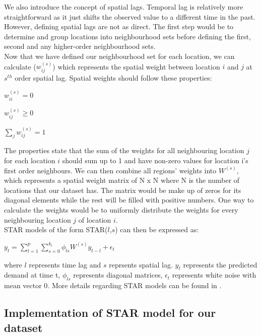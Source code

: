 \documentclass[nonblindrev,msom]{informs3} %
\begin{document}
\noindent We also introduce the concept of spatial lags. Temporal lag is relatively more straightforward as it just shifts the observed value to a different time in the past. However, defining spatial lags are not as direct. The first step would be to determine and group locations into neighbourhood sets before defining the first, second and any higher-order neighbourhood sets.  \\

\noindent Now that we have defined our neighbourhood set for each location, we can calculate ($w_{ij}^{(s)}$) which represents the spatial weight between location $i$ and $j$ at $s^{th}$ order spatial lag. Spatial weights should follow these properties: 

\begin{center}

	$\displaystyle w_{ii}^{(s)} = 0$
	
    $\displaystyle w_{ij}^{(s)} \geq 0$
    
    $\displaystyle \sum_{j} w_{ij}^{(s)} = 1$
\end{center}

\noindent The properties state that the sum of the weights for all neighbouring location $j$ for each location $i$ should sum up to 1 and have non-zero values for location i's first order neighbours. We can then combine all regions' weights into $W^{(s)}$, which represents a spatial weight matrix of N x N where N is the number of locations that our dataset has. The matrix would be make up of zeros for its diagonal elements while the rest will be filled with positive numbers. One way to calculate the weights would be to uniformly distribute the weights for every neighbouring location $j$ of location $i$. \\


\noindent STAR models of the form STAR($l$,$s$) can then be expressed as: 

\begin{center}
    $\displaystyle y_{t} = \sum_{l=1}^{p}\sum_{s=0}^{k_l}\phi_{ls} W^{(s)}y_{t-l} + \epsilon_{t}$
\end{center}

\noindent where $l$ represents time lag and $s$ reprsents spatial lag. $y_{t}$ represents the predicted demand at time t, $\phi_{ls}$ represents diagonal matrices, $\epsilon_{t}$ represents white noise with mean vector 0. 
More details regarding STAR models can be found in \cite{KURT20152537}.


\subsection{Implementation of STAR model for our dataset}
\end{document}
